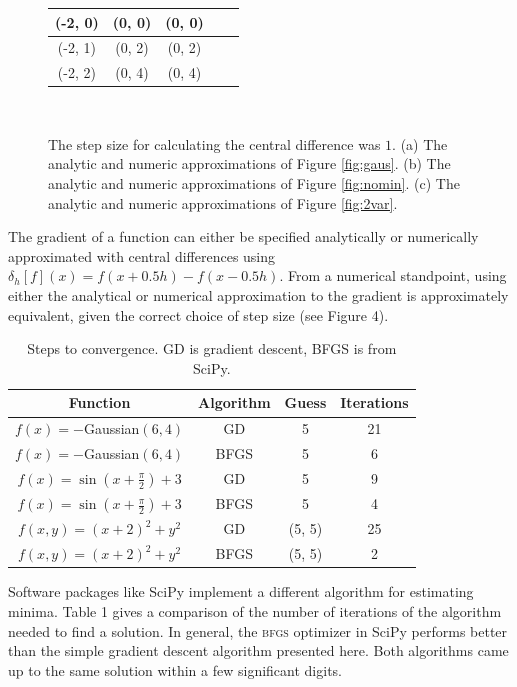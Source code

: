 \documentclass[10pt]{article}
\begin{document}
\begin{figure}[!ht]
{\begin{subtable}[ht]{0.4\textwidth}
\begin{tabular}[ht]{ccccc}
		(-2, 0) & (0, 0) & (0, 0) \\\hline
		(-2, 1) & (0, 2) & (0, 2) \\\hline
		(-2, 2) & (0, 4) & (0, 4) \\\hline
	\end{tabular}
	\vspace{5mm}
	\label{tbl:2varcd}
	\caption{}
	\end{subtable}
	}\\
	\label{fig:centraldiff}
	\caption{The step size for calculating the central difference was $1$. (a) The analytic and numeric approximations of Figure \ref{fig:gaus}. (b) The analytic and numeric approximations of Figure \ref{fig:nomin}.  (c) The analytic and numeric approximations of Figure \ref{fig:2var}.}
\end{figure}

The gradient of a function can either be specified analytically or numerically approximated with central differences using $\delta_{h}[f](x) = f(x + 0.5h) - f(x - 0.5h)$. From a numerical standpoint, using either the analytical or numerical approximation to the gradient is approximately equivalent, given the correct choice of step size (see Figure 4).

\begin{table}[!ht]
\centering
\begin{tabular}[ht]{cccc}
Function & Algorithm & Guess & Iterations \\\hline
$f(x) = -$Gaussian$(6, 4)$ & GD & 5 & 21 \\
$f(x) = -$Gaussian$(6, 4)$ & \textsc{BFGS} & 5 & 6 \\
$f(x) = \sin(x + \frac{\pi}{2}) + 3$ & GD & 5 & 9 \\
$f(x) = \sin(x + \frac{\pi}{2}) + 3$ & \textsc{BFGS} & 5 & 4 \\
$f(x, y) = (x + 2)^2 + y^2$ & GD & (5, 5) & 25 \\
$f(x, y) = (x + 2)^2 + y^2$ & \textsc{BFGS} & (5, 5) & 2 \\
\end{tabular}
\label{tbl:bfgs}
\caption{Steps to convergence. GD is gradient descent, \textsc{BFGS} is from SciPy.}
\end{table}

Software packages like SciPy implement a different algorithm for estimating minima. Table 1 gives a comparison of the number of iterations of the algorithm needed to find a solution. In general, the \textsc{bfgs} optimizer in SciPy performs better than the simple gradient descent algorithm presented here. Both algorithms came up to the same solution within a few significant digits.
\end{document}
